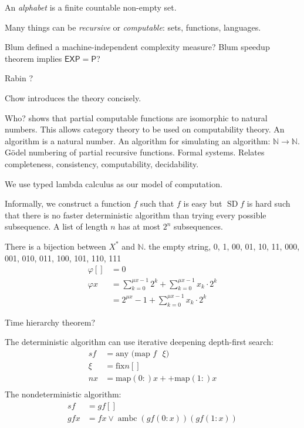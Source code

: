 \documentclass[10pt,statementpaper]{memoir}
\theoremstyle{definition}
\newcommand\ambc{\operatorname{ambc}}
\newcommand\EXPTIME{\ensuremath{\mathsf{EXP}}}
\newcommand\PTIME{\ensuremath{\mathsf{P}}}
\newcommand\SDP{\ensuremath{\operatorname{SD}}}
\begin{document}
An \emph{alphabet} is a finite countable non-empty set.

Many things can be \emph{recursive} or \emph{computable}: sets, functions, languages.

Blum \cite{Blum1967} defined a machine-independent complexity measure?
Blum speedup theorem implies $\EXPTIME = \PTIME$?

Rabin \cite{Rabin1977}?

Chow \cite{Chow1976} introduces the theory concisely.

Who? shows that partial computable functions are isomorphic to natural numbers.
This allows category theory to be used on computability theory.
An algorithm is a natural number.
An algorithm for simulating an algorithm: $\mathbb N \to \mathbb N$.
G\"odel numbering of partial recursive functions.
Formal systems.
Relates completeness, consistency, computability, decidability.

We use typed lambda calculus as our model of computation.

Informally, we construct a function $f$ such that $f$ is easy but $\SDP f$ is hard
such that there is no faster deterministic algorithm
than trying every possible subsequence.
A list of length $n$ has at most $2^n$ subsequences.

There is a bijection between $X^*$ and $\mathbb N$.
the empty string, 0, 1, 00, 01, 10, 11, 000, 001, 010, 011, 100, 101, 110, 111
\begin{align}
    \varphi [] &= 0
  \\ \varphi x &= \sum_{k=0}^{\mu x - 1} 2^k + \sum_{k=0}^{\mu x - 1} x_k \cdot 2^k
            \\ &= 2^{\mu x} - 1 + \sum_{k=0}^{\mu x - 1} x_k \cdot 2^k
\end{align}

Time hierarchy theorem?

The deterministic algorithm can use iterative deepening depth-first search:
\begin{align}
    sf &= \text{any $($map $f$ $\xi)$}
    \\
    \xi &= \text{fix} n []
    \\
    nx &= \text{map} (0:) x ++ \text{map} (1:) x
    \\
\end{align}
The nondeterministic algorithm:
\begin{align}
    sf &= gf[]
    \\
    gfx &= fx \vee \ambc (gf(0:x)) (gf(1:x))
\end{align}
\end{document}

